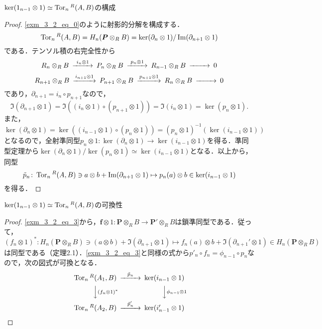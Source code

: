 \begin{screen}
  $\ker (1_{n-1} \otimes 1) \simeq \operatorname{Tor}_n{}^R (A, B)$の構成
\end{screen}
\begin{proof}
  \eqref{exm_3_2_eq_0}のように射影的分解を構成する．
  \[ \operatorname{Tor}_n{}^R (A, B) = H_n(\boldsymbol{P} \otimes_R B) = \ker (\partial_n \otimes 1) / \operatorname{Im} (\partial_{n+1} \otimes 1) \]
  である．テンソル積の右完全性から
  \[
  \begin{CD}
    R_n \otimes_R B @>{i_n \otimes 1}>> P_n \otimes_R B @>{p_n \otimes 1}>> R_{n-1} \otimes_R B @>>> 0
  \end{CD}
  \]
  \[
  \begin{CD}
    R_{n+1} \otimes_R B @>{i_{n+1} \otimes 1}>> P_{n+1} \otimes_R B @>{p_{n+1} \otimes 1}>> R_n \otimes_R B @>>> 0
  \end{CD}
  \]
  であり，$\partial_{n+1} = i_n \circ p_{n+1}$なので，
  \[ \Im (\partial_{n+1} \otimes 1) = \Im ((i_n \otimes 1) \circ (p_{n+1} \otimes 1)) = \Im (i_n \otimes 1) = \ker (p_n \otimes 1) . \]
  また，
  \[ \ker (\partial_n \otimes 1) = \ker ((i_{n-1} \otimes 1) \circ (p_n \otimes 1)) = (p_n \otimes 1)^{-1}(\ker (i_{n-1} \otimes 1)) \]
  となるので，全射準同型$p_n \otimes 1 \colon \ker (\partial_n \otimes 1) \to \ker (i_{n-1} \otimes 1)$を得る．準同型定理から$\ker (\partial_n \otimes 1) / \ker (p_n \otimes 1) \simeq \ker (i_{n-1} \otimes 1)$となる．以上から，同型
  \[ \tilde{p}_n \colon \operatorname{Tor}_n{}^R (A, B) \ni a \otimes b + \operatorname{Im} (\partial_{n+1} \otimes 1) \mapsto p_n(a) \otimes b \in \ker (i_{n-1} \otimes 1) \]
  を得る．
\end{proof}

\begin{screen}
  $\ker (1_{n-1} \otimes 1) \simeq \operatorname{Tor}_n{}^R (A, B)$の可換性
\end{screen}
\begin{proof}
  \eqref{exm_3_2_eq_3}から，$\boldsymbol{f} \otimes 1 \colon \boldsymbol{P} \otimes_R B \to \boldsymbol{P}' \otimes_R B$は鎖準同型である．従って，
  \[ (f_n \otimes 1)^\ast \colon H_n (\boldsymbol{P} \otimes_R B) \ni (a \otimes b) + \Im (\partial_{n+1} \otimes 1) \mapsto f_n(a) \otimes b + \Im (\partial_{n+1}' \otimes 1) \in H_n (\boldsymbol{P} \otimes_R B) \]
  は同型である（定理2.1）．\eqref{exm_3_2_eq_3}と同様の式から$p'_n \circ f_n = \phi_{n-1} \circ p_n$なので，次の図式が可換となる．
  \[
  \begin{CD}
    \Tor_n{}^R (A_1, B) @>{\tilde{p}_n}>> \ker (i_{n-1} \otimes 1) \\
    @VV{(f_n \otimes 1)^\ast}V @VV{\phi_{n-1} \otimes 1}V \\
    \Tor_n{}^R (A_2, B) @>{\tilde{p}_n'}>> \ker (i_{n-1}' \otimes 1)
  \end{CD}
  \]
\end{proof}

